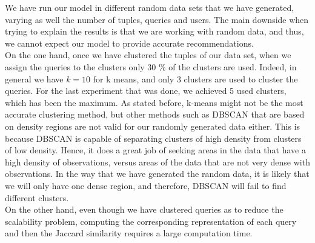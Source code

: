 \documentclass[sigconf]{acmart}
\begin{document}
We have run our model in different random data sets that we have generated, varying as well the number of tuples, queries and users. The main downside when trying to explain the results is that we are working with random data, and thus, we cannot expect our model to provide accurate recommendations. \\

On the one hand, once we have clustered the tuples of our data set, when we assign the queries to the clusters only 30 $\%$ of the clusters are used. Indeed, in general we have $k=10$ for k means, and only 3 clusters are used to cluster the queries. For the last experiment that was done, we achieved 5 used clusters, which has been the maximum. As stated before, k-means might not be the most accurate clustering method, but other methods such as DBSCAN that are based on density regions are not valid for our randomly generated data either. This is because DBSCAN is capable of separating clusters of high density from clusters of low density. Hence, it does a great job of seeking areas in the data that have a high density of observations, versus areas of the data that are not very dense with observations. In the way that we have generated the random data, it is likely that we will only have one dense region, and therefore, DBSCAN will fail to find different clusters.\\

On the other hand, even though we have clustered queries as to reduce the scalability problem, computing the corresponding representation of each query and then the Jaccard similarity requires a large computation time. \\
\end{document}
